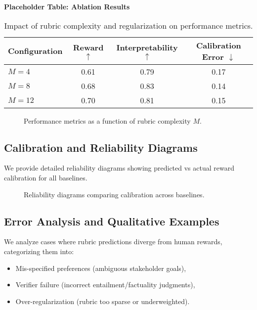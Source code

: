 \documentclass[sigconf]{acmart}
\begin{document}
\textbf{Placeholder Table: Ablation Results}
\begin{table}[h]
\centering
\caption{Impact of rubric complexity and regularization on performance metrics.}
\begin{tabular}{lccc}
\toprule
Configuration & Reward $\uparrow$ & Interpretability $\uparrow$ & Calibration Error $\downarrow$ \\
\midrule
$M=4$ & 0.61 & 0.79 & 0.17 \\
$M=8$ & 0.68 & 0.83 & 0.14 \\
$M=12$ & 0.70 & 0.81 & 0.15 \\
\bottomrule
\end{tabular}
\label{tab:ablation}
\end{table}

\begin{figure}[h]
\centering
{}
\caption{Performance metrics as a function of rubric complexity $M$.}
\label{fig:ablation}
\end{figure}

\subsection{Calibration and Reliability Diagrams}

We provide detailed reliability diagrams showing predicted vs actual reward calibration for all baselines.

\begin{figure}[h]
\centering
{}
\caption{Reliability diagrams comparing calibration across baselines.}
\label{fig:reliability}
\end{figure}

\subsection{Error Analysis and Qualitative Examples}
We analyze cases where rubric predictions diverge from human rewards, categorizing them into:
\begin{itemize}
    \item Mis-specified preferences (ambiguous stakeholder goals),
    \item Verifier failure (incorrect entailment/factuality judgments),
    \item Over-regularization (rubric too sparse or underweighted).
\end{itemize}
\end{document}
